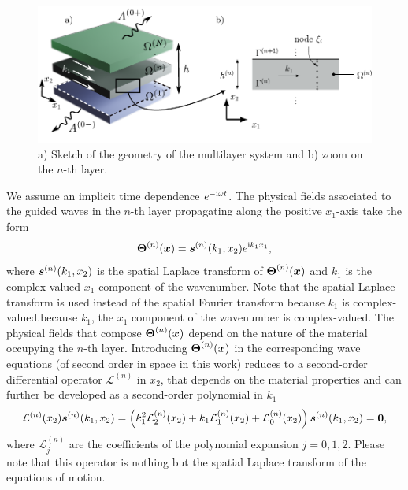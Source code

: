 \begin{figure}
    \centering
    \includegraphics{chapitres/article_JAP/figures/fig1_schema.pdf}
    \caption{a) Sketch of the geometry of the multilayer system and b) zoom on the $n$-th layer.}
    \label{fig:schema_multilayer}
\end{figure}   
We assume an implicit time dependence $e^{-\mathrm i \omega t}$. The physical fields associated to the guided waves in the $n$-th layer propagating along the positive $x_1$-axis take the form
    \begin{equation}
         \boldsymbol{\Theta}^{(n)}  (\boldsymbol x) = \boldsymbol s^{(n)}(k_1,x_2) e^{\mathrm i k_1 x_1},
        \label{eq:field_ansatz}
    \end{equation}
where $\boldsymbol s^{(n)}(k_1, x_2)$ is the spatial Laplace transform of $\boldsymbol{\Theta}^{(n)} (\boldsymbol x)$ and $k_1$ is the complex valued $x_1$-component of the wavenumber. Note that the spatial Laplace transform is used instead of the spatial Fourier transform because $k_1$ is complex-valued.because $ k_1$, the $x_1$ component of the wavenumber is complex-valued. The physical fields that compose $\boldsymbol{\Theta}^{(n)}  (\boldsymbol x)$ depend on the nature of the material occupying the $n$-th layer. Introducing $\boldsymbol{\Theta}^{(n)}  (\boldsymbol x)$ in the corresponding wave equations (of second order in space in this work) reduces to a second-order differential operator $\mathcal L^{(n)}$ in $x_2$, that depends on the material properties and can further be developed as a second-order polynomial in $ k_1$
    \begin{equation}
        \mathcal L^{(n)}(x_2) \boldsymbol s^{(n)}(k_1, x_2) = \left( k_1^2\mathcal L_2^{(n)}(x_2) + k_1\mathcal L_1^{(n)}(x_2) + \mathcal L_0^{(n)}(x_2) \right) \boldsymbol s^{(n)}(k_1, x_2) = \boldsymbol 0,
        \label{eq:operator_decomposition}
    \end{equation}
where $\mathcal L^{(n)}_j$ are the coefficients of the polynomial expansion $j=0,1,2$. Please note that this operator is nothing but the spatial Laplace transform of the equations of motion. 
    
